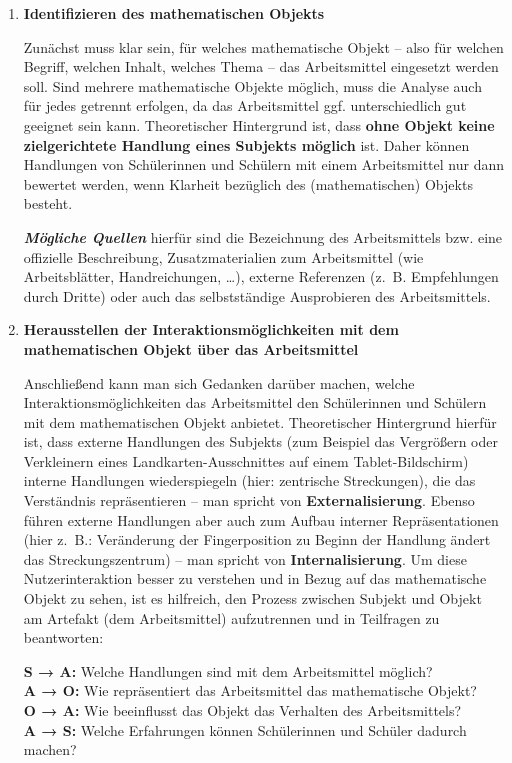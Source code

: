 \documentclass[
]{scrbook}
\theoremstyle{definition}
\theoremstyle{definition}
\theoremstyle{definition}
\theoremstyle{definition}
\theoremstyle{remark}
\begin{document}
\begin{enumerate}
\def\labelenumi{\arabic{enumi}.}
\item
  \textbf{Identifizieren des mathematischen Objekts}

  Zunächst muss klar sein, für welches mathematische Objekt -- also für welchen Begriff, welchen Inhalt, welches Thema -- das Arbeitsmittel eingesetzt werden soll. Sind mehrere mathematische Objekte möglich, muss die Analyse auch für jedes getrennt erfolgen, da das Arbeitsmittel ggf. unterschiedlich gut geeignet sein kann. Theoretischer Hintergrund ist, dass \textbf{ohne Objekt keine zielgerichtete Handlung eines Subjekts möglich} ist. Daher können Handlungen von Schülerinnen und Schülern mit einem Arbeitsmittel nur dann bewertet werden, wenn Klarheit bezüglich des (mathematischen) Objekts besteht.

  \textbf{\emph{Mögliche Quellen}} hierfür sind die Bezeichnung des Arbeitsmittels bzw. eine offizielle Beschreibung, Zusatzmaterialien zum Arbeitsmittel (wie Arbeitsblätter, Handreichungen, \ldots), externe Referenzen (z.~B. Empfehlungen durch Dritte) oder auch das selbstständige Ausprobieren des Arbeitsmittels.
\item
  \textbf{Herausstellen der Interaktionsmöglichkeiten mit dem mathematischen Objekt über das Arbeitsmittel}

  Anschließend kann man sich Gedanken darüber machen, welche Interaktionsmöglichkeiten das Arbeitsmittel den Schülerinnen und Schülern mit dem mathematischen Objekt anbietet. Theoretischer Hintergrund hierfür ist, dass externe Handlungen des Subjekts (zum Beispiel das Vergrößern oder Verkleinern eines Landkarten-Ausschnittes auf einem Tablet-Bildschirm) interne Handlungen wiederspiegeln (hier: zentrische Streckungen), die das Verständnis repräsentieren -- man spricht von \textbf{Externalisierung}. Ebenso führen externe Handlungen aber auch zum Aufbau interner Repräsentationen (hier z.~B.: Veränderung der Fingerposition zu Beginn der Handlung ändert das Streckungszentrum) -- man spricht von \textbf{Internalisierung}. Um diese Nutzerinteraktion besser zu verstehen und in Bezug auf das mathematische Objekt zu sehen, ist es hilfreich, den Prozess zwischen Subjekt und Objekt am Artefakt (dem Arbeitsmittel) aufzutrennen und in Teilfragen zu beantworten:

  \textbf{S → A:} Welche Handlungen sind mit dem Arbeitsmittel möglich?\\
  \textbf{A → O:} Wie repräsentiert das Arbeitsmittel das mathematische Objekt?\\
  \textbf{O → A:} Wie beeinflusst das Objekt das Verhalten des Arbeitsmittels?\\
  \textbf{A → S:} Welche Erfahrungen können Schülerinnen und Schüler dadurch machen?


\end{enumerate}
\end{document}
